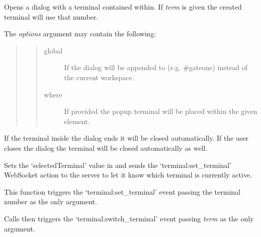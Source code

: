 \documentclass[letterpaper,10pt,openany]{sphinxmanual}
\begin{document}
\begin{fulllineitems}
\label{Applications/terminal/js_terminal:GateOne.Terminal.popupTerm}
Opens a dialog with a terminal contained within.  If \emph{term} is given the created terminal will use that number.

The \emph{options} argument may contain the following:
\begin{quote}
\begin{quote}\begin{description}
\item[{global}] \leavevmode
If  the dialog will be appended to  (e.g. \#gateone) instead of the current workspace.

\item[{where}] \leavevmode
If provided the popup terminal will be placed within the given element.

\end{description}\end{quote}
\end{quote}

If the terminal inside the dialog ends it will be closed automatically.  If the user closes the dialog the terminal will be closed automatically as well.

\end{fulllineitems}


\begin{fulllineitems}
\label{Applications/terminal/js_terminal:GateOne.Terminal.setTerminal}
Sets the `selectedTerminal' value in  and sends the `terminal:set\_terminal' WebSocket action to the server to let it know which terminal is currently active.

This function triggers the `terminal:set\_terminal' event passing the terminal number as the only argument.

\end{fulllineitems}


\begin{fulllineitems}
\label{Applications/terminal/js_terminal:GateOne.Terminal.switchTerminal}
Calls  then triggers the `terminal:switch\_terminal' event passing \emph{term} as the only argument.

\end{fulllineitems}
\end{document}

